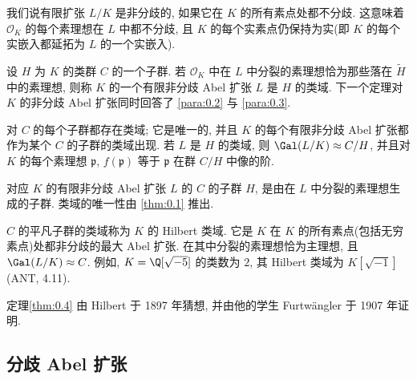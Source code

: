我们说有限扩张 $L/K$ 是非分歧的, 如果它在 $K$ 的所有素点处都不分歧. 这意味着 $\mathcal{O}_{K}$ 的每个素理想在 $L$ 中都不分歧, 且 $K$ 的每个实素点仍保持为实(即 $K$ 的每个实嵌入都延拓为 $L$ 的一个实嵌入).

设 $H$ 为 $K$ 的类群 $C$ 的一个子群. 若 $\mathcal{O}_{K}$ 中在 $L$ 中分裂的素理想恰为那些落在 $\tilde{H}$ 中的素理想, 则称 $K$ 的一个有限非分歧 Abel 扩张 $L$ 是 $H$ 的类域. 下一个定理对 $K$ 的非分歧 Abel 扩张同时回答了 \ref{para:0.2} 与 \ref{para:0.3}.

\begin{theorem}\label{thm:0.4}
对 $C$ 的每个子群都存在类域; 它是唯一的, 并且 $K$ 的每个有限非分歧 Abel 扩张都作为某个 $C$ 的子群的类域出现. 若 $L$ 是 $H$ 的类域, 则 $\Gal(L/K) \approx C/H$, 并且对 $K$ 的每个素理想 $\mathfrak{p}$, $f(\mathfrak{p})$ 等于 $\mathfrak{p}$ 在群 $C/H$ 中像的阶.
\end{theorem}

对应 $K$ 的有限非分歧 Abel 扩张 $L$ 的 $C$ 的子群 $H$, 是由在 $L$ 中分裂的素理想生成的子群. 类域的唯一性由 \ref{thm:0.1} 推出.

$C$ 的平凡子群的类域称为 $K$ 的 Hilbert 类域. 它是 $K$ 在 $K$ 的所有素点(包括无穷素点)处都非分歧的最大 Abel 扩张. 在其中分裂的素理想恰为主理想, 且 $\Gal(L/K) \approx C$. 例如, $K = \Q[\sqrt{-5}]$ 的类数为 $2$, 其 Hilbert 类域为 $K[\sqrt{-1}]$ (ANT, 4.11).

\begin{NOTES}
定理\ref{thm:0.4} 由 Hilbert 于 1897 年猜想, 并由他的学生 Furtw\"angler 于 1907 年证明.
\end{NOTES}

\subsection*{分歧 Abel 扩张}

